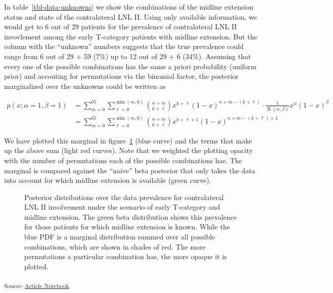 \documentclass[
  sn-mathphys-num,
]{sn-jnl}
\begin{document}
In table~\ref{tbl-data-unknowns} we show the combinations of the midline
extension status and state of the contralateral LNL II. Using only
available information, we would get to 6 out of 29 patients for the
prevalence of contralateral LNL II invovlement among the early
T-category patients with midline extension. But the column with the
``unknown'' numbers suggests that the true prevalence could range from 6
out of 29 + 59 (7\%) up to 12 out of 29 + 6 (34\%). Assuming that every
one of the possible combinations has the same a priori probability
(uniform prior) and accouting for permutations via the binomial factor,
the posterior marginalized over the unknowns could be written as

\[
\begin{aligned}
p(x; \alpha=1, \beta=1) &= \sum_{m=0}^{65} \sum_{\ell=0}^{\min(m,6)} \binom{n+m}{k+\ell} x^{k+\ell} (1-x)^{n+m - (k+\ell)} \cdot \frac{1}{\operatorname{B}(\alpha, \beta)} x^\alpha (1-x)^\beta \\
&= \sum_{m=0}^{65} \sum_{\ell=0}^{\min(m,6)} \binom{n+m}{k+\ell} x^{k+\ell+1} (1-x)^{n+m - (k+\ell) + 1}
\end{aligned}
\]

We have plotted this marginal in figure~\ref{fig-model-marginal-pdf}
(blue curve) and the terms that make up the above sum (light red
curves). Note that we weighted the plotting opacity with the number of
permutations each of the possible combinations has. The marginal is
compared against the ``naive'' beta posterior that only takes the data
into account for which midline extension is available (green curve).

\begin{figure}


\caption{\label{fig-model-marginal-pdf}Posterior distributions over the
data prevalence for contralateral LNL II involvement under the scenario
of early T-category and midline extension. The green beta distribution
shows this prevalence for those patients for which midline extension is
known. While the blue PDF is a marginal distribution summed over all
possible combinations, which are shown in shades of red. The more
permutations a particular combination has, the more opaque it is
plotted.}

\end{figure}%

\textsubscript{Source:
\href{https://rmnldwg.github.io/bilateral-paper/manuscript-preview.html}{Article
Notebook}}


  
\end{document}
